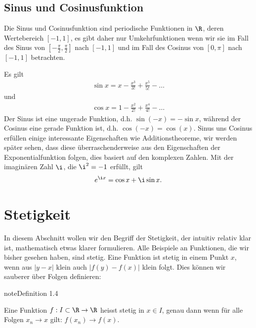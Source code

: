 \documentclass[letterpaper,10pt,english]{jupyterBook}
\begin{document}
\subsection{Sinus\sphinxhyphen{} und Cosinusfunktion}
\label{\detokenize{vorkurs/funktionen:sinus-und-cosinusfunktion}}
Die Sinus\sphinxhyphen{} und Cosinusfunktion sind periodische Funktionen in \(\R\), deren Wertebereich \([-1,1]\), es gibt daher nur Umkehrfunktionen wenn wir sie im Fall des Sinus von \([-\frac{\pi}2,\frac{\pi}2]\) nach \([-1,1]\) und im Fall des Cosinus von \([0,\pi]\) nach \([-1,1]\) betrachten.

Es gilt
\begin{equation*}
\begin{split} \sin x = x - \frac{x^3}{3!} + \frac{x^5}{5!} - \ldots \end{split}
\end{equation*}
und
\begin{equation*}
\begin{split}\cos x = 1- \frac{x^2}{2!} + \frac{x^4}{4!} - \ldots \end{split}
\end{equation*}
Der Sinus ist eine ungerade Funktion, d.h. \(\sin (-x) = -  \sin x\), während der Cosinus eine gerade Funktion ist, d.h. \(\cos(-x) = \cos(x)\). Sinus uns Cosinus erfüllen einige interessante Eigenschaften wie Additionstheoreme, wir werden später sehen, dass diese überraschenderweise aus den Eigenschaften der Exponentialfunktion folgen, dies basiert auf den komplexen Zahlen. Mit der imaginären Zahl \(\i\), die \(\i^2 = -1\) erfüllt, gilt
\begin{equation*}
\begin{split} e^{\i x}  = \cos x + \i \sin x. \end{split}
\end{equation*}

\section{Stetigkeit}
\label{\detokenize{vorkurs/stetigkeit:stetigkeit}}\label{\detokenize{vorkurs/stetigkeit::doc}}
In diesem Abschnitt wollen wir den Begriff der Stetigkeit, der intuitiv relativ klar ist, mathematisch etwas klarer formulieren. Alle Beispiele an Funktionen, die wir bisher gesehen haben, sind stetig. Eine Funktion ist stetig in einem Punkt \(x\), wenn aus \(|y-x|\) klein auch \(|f(y)-f(x)|\) klein folgt. Dies können wir sauberer über Folgen definieren:
\label{vorkurs/stetigkeit:definition-0}
\begin{sphinxadmonition}{note}{Definition 1.4}



Eine Funktion \(f: I \subset \R \rightarrow \R\) heisst stetig in \(x \in I\), genau dann wenn für alle Folgen \(x_n \rightarrow x\) gilt: \(f(x_n) \rightarrow f(x)\).
\end{sphinxadmonition}
\end{document}
